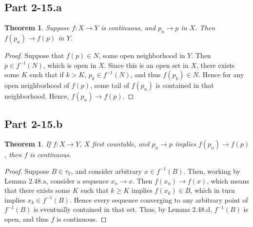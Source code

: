\documentclass{article}
\newtheorem{theorem}[subsection]{Theorem}
\theoremstyle{definition}
\begin{document}
\subsection{Part 2-15.a}
\begin{theorem}
Suppose $f : X \to Y$ is continuous, and $p_n\to p$ in $X$. Then
$f(p_n) \to f(p)$ in $Y$.
\end{theorem}
\begin{proof}
Suppose that $f(p) \in N$, some open neighborhood in $Y$. 
Then $p \in f^{-1}(N)$, which is open in $X$. Since this is an open
set in $X$, there exists some $K$ such that if $k > K$, 
$p_k \in f^{-1}(N)$, and thus $f(p_k) \in N$. Hence for any open
neighborhood of $f(p)$, some tail of $f(p_n)$ is contained in
that neighborhood. Hence, $f(p_n) \to f(p)$.
\end{proof}

\subsection{Part 2-15.b}
\begin{theorem}
If $f : X \to Y$, $X$ first countable, and $p_n \to p$ implies 
$f(p_n) \to f(p)$, then $f$ is continuous.
\end{theorem}
\begin{proof}
Suppose $B \in \tau_Y$, and consider arbitrary $x \in f^{-1}(B)$. Then, working
by Lemma 2.48.a, consider a sequence $x_n \to x$. Then $f(x_n) \to f(x)$, which 
means that there exists some $K$ such that $k\ge K$ implies $f(x_k) \in B$, 
which in turn implies $x_k \in f^{-1}(B)$. Hence every sequence converging to
any arbitrary point of $f^{-1}(B)$ is eventually contained in that set. Thus,
by Lemma 2.48.d, $f^{-1}(B)$ is open, and thus $f$ is continuous.
\end{proof}
\end{document}
